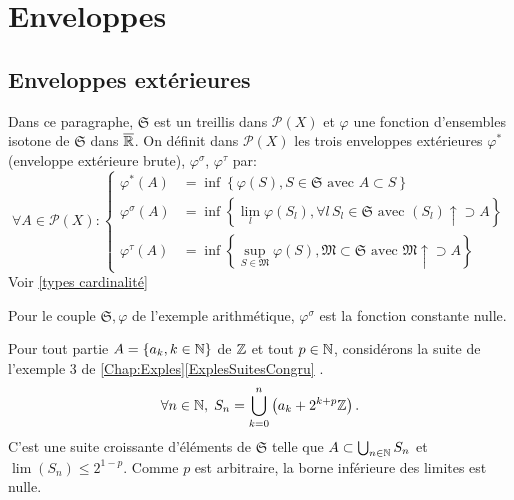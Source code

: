 \section{Enveloppes}\label{Enveloppes}
\subsection{Enveloppes extérieures}
Dans ce paragraphe, $\mathfrak{S}$ est un treillis dans $\mathcal{P}(X)$ et $\varphi$ une fonction d'ensembles isotone de $\mathfrak{S}$ dans $\overline{\mathbb{R}}$. On définit dans $\mathcal{P}(X)$ les trois enveloppes extérieures $\varphi^*$ (enveloppe extérieure brute), $\varphi^\sigma$, $\varphi^\tau$ par:
\begin{displaymath}
 \forall A \in  \mathcal{P}(X):
 \left\lbrace
 \begin{aligned}
    \varphi^*(A) &= \inf \left\lbrace \varphi(S), S \in \mathfrak{S} \text{ avec } A \subset S \right\rbrace \\
    \varphi^\sigma(A) &= \inf \left\lbrace \lim_{l}  \varphi(S_l), \forall l \, S_l\in \mathfrak{S} \text{ avec } (S_l) \uparrow \supset A \right\rbrace \\
    \varphi^\tau(A) &= \inf \left\lbrace \sup_{S \in \mathfrak{M}} \varphi(S), \mathfrak{M} \subset \mathfrak{S} \text{ avec } \mathfrak{M}\uparrow \supset A\right\rbrace
 \end{aligned}
 \right.
\end{displaymath}
Voir \ref{types cardinalité}
\begin{prop}
 Pour le couple $\mathfrak{S}, \varphi$ de l'exemple arithmétique, $\varphi^\sigma$ est la fonction constante nulle.
\end{prop}
\begin{demo}
 Pour tout partie $A = \left\lbrace a_k , k \in \mathbb{N}\right\rbrace$ de $\mathbb{Z}$ et tout $p\in \mathbb{N}$, considérons la suite de l'exemple 3 de \ref{Chap:Exples}\ref{ExplesSuitesCongru} .
 \begin{displaymath}
  \forall n \in \mathbb{N}, \; S_n = \bigcup_{k =0}^n \left(a_k + 2^{k+p} \mathbb{Z}\right) .
 \end{displaymath}
 C'est une suite croissante d'éléments de $\mathfrak{S}$ telle que $A \subset \bigcup_{n\in \mathbb{N}}S_n$ et $\lim (S_n) \leq 2^{1-p}$. Comme $p$ est arbitraire, la borne inférieure des limites est nulle.
\end{demo}

